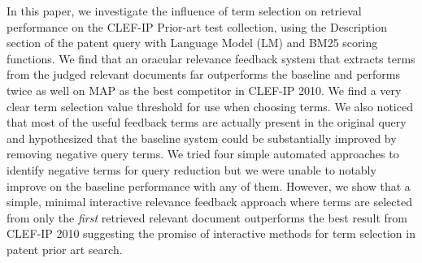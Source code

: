 In this paper, we investigate the influence of term selection on retrieval
performance on the CLEF-IP Prior-art test collection, using the Description section of the patent query with Language Model (LM) and BM25 scoring functions. We find that an oracular relevance feedback system that extracts terms from the judged relevant documents far
outperforms the baseline and performs twice as well on MAP as the best
competitor in CLEF-IP 2010.  We find a very clear term selection value
threshold for use when choosing terms.  We also noticed that most of
the useful feedback terms are actually present in the original query
and hypothesized that the baseline system could be substantially
improved by removing negative query terms.
We tried four simple automated approaches to identify negative terms
for query reduction but we were unable to notably improve on the baseline
performance with any of them.  However, we show that a
simple, minimal interactive relevance feedback approach where terms are selected
from only the \emph{first} retrieved relevant document outperforms the best
result from CLEF-IP 2010 suggesting the promise of interactive methods
for term selection in patent prior art search.

\begin{comment}
We investigate the influence of term selection on retrieval performance on the CLEF-IP Prior Art test collection, starting with the Description section of the reference patent and using LM and BM25 scoring functions.    We find that an oracular relevance feedback system which extracts terms from the judged relevant documents far outperforms the baseline and  performs twice as well on MAP as the best competitor in CLEF-2014.  We find a very clear term selection value threshold for use when choosing terms.  A much more realistic approach in which feedback terms are extracted only from the first relevant document retrieved, still outperforms last year’s winner.   We noticed that most of the useful feedback terms are actually present in the original query and hypothesized that the baseline system could be substantially improved by removing negative query terms.  We tried three different approaches to identifying negative terms but were unable to improve on the baseline performance with any of them.
\end{comment}


